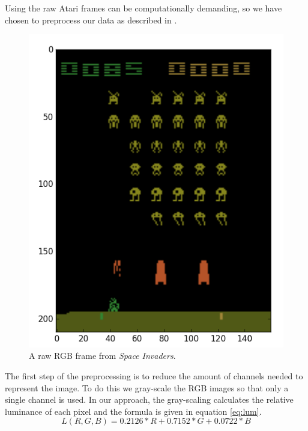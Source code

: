 \documentclass[11pt]{article}
\begin{document}
Using the raw Atari frames can be computationally demanding, so we have chosen
to preprocess our data as described in \cite{dqn}. 
\begin{figure}[!h]
    \centering
    \includegraphics[scale=0.35]{include/space_invaders_1.png}
    \caption{A raw RGB frame from \textit{Space Invaders}.}
    \label{fig:si}
\end{figure}
The first step of the preprocessing is to reduce the amount of channels needed to
represent the image.
To do this we gray-scale the RGB images so that only a single channel is used.
In our approach, the gray-scaling calculates the relative luminance\cite{luminance} of each pixel and the formula is given in equation \ref{eq:lum}.
\begin{equation}\label{eq:lum}
    L(R, G, B) = 0.2126*R + 0.7152*G + 0.0722*B
\end{equation}
\end{document}
